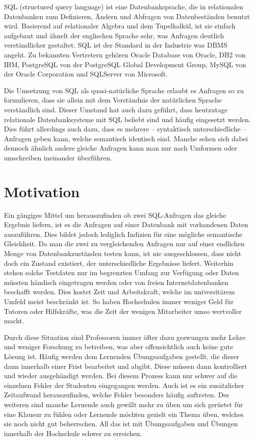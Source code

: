 
SQL (structured query language) ist eine Datenbanksprache, die in relationalen Datenbanken zum Definieren, Ändern und Abfragen von Datenbeständen benutzt wird. Basierend auf relationaler Algebra und dem Tupelkalkül, ist sie einfach aufgebaut und ähnelt der englischen Sprache sehr, was Anfragen deutlich verständlicher gestaltet. SQL ist der Standard in der Industrie was DBMS angeht. Zu bekannten Vertretern gehören Oracle Database von Oracle, DB2 von IBM, PostgreSQL von der PostgreSQL Global Development Group, MySQL von der Oracle Corporation und SQLServer von Microsoft.

Die Umsetzung von SQL als quasi-natürliche Sprache erlaubt es Anfragen so zu formulieren, dass sie allein mit dem Verständnis der natürlichen Sprache verständlich sind. Dieser Umstand hat auch dazu geführt, dass heutzutage relationale Datenbanksysteme mit SQL beliebt sind und häufig eingesetzt werden. 
Dies führt allerdings auch dazu, dass es mehrere -- syntaktisch unterschiedliche -- Anfragen geben kann, welche semantisch identisch sind. Manche sehen sich dabei dennoch ähnlich andere gleiche Anfragen kann man nur nach Umformen oder umschreiben ineinander überführen. 

\section{Motivation}

Ein gängiges Mittel um herauszufinden ob zwei SQL-Anfragen das gleiche Ergebnis liefern, ist es die Anfragen auf einer Datenbank mit vorhandenen Daten auszuführen. Dies bildet jedoch lediglich Indizien für eine mögliche semantische Gleichheit. Da man die zwei zu vergleichenden Anfragen nur auf einer endlichen Menge von Datenbankzuständen testen kann, ist nie ausgeschlossen, dass nicht doch ein Zustand existiert, der unterschiedliche Ergebnisse liefert. Weiterhin stehen solche Testdaten nur im begrenzten Umfang zur Verfügung oder Daten müssten händisch eingetragen werden oder von freien Internetdatenbanken beschafft werden. Dies kostet Zeit und Arbeitskraft, welche im universitärem Umfeld meist beschränkt ist. So haben Hochschulen immer weniger Geld für Tutoren oder Hilfskräfte, was die Zeit der wenigen Mitarbeiter umso wertvoller macht.

Durch diese Situation sind Professoren immer öfter dazu gezwungen mehr Lehre und weniger Forschung zu betreiben, was aber offensichtlich auch keine gute Lösung ist. Häufig werden dem Lernenden Übungsaufgaben gestellt, die dieser dann innerhalb einer Frist bearbeitet und abgibt. Diese müssen dann kontrolliert und wieder ausgehändigt werden. Bei diesem Prozess kann nur schwer auf die einzelnen Fehler der Studenten eingegangen werden. Auch ist es ein zusätzlicher Zeitaufwand herauszufinden, welche Fehler besonders häufig auftreten. Des weiteren sind manche Lernende auch gewillt mehr zu üben um sich gerüstet für eine Klausur zu fühlen oder Lernende möchten gezielt ein Thema üben, welches sie noch nicht gut beherrschen. All das ist mit Übungsaufgaben und Übungen innerhalb der Hochschule schwer zu erreichen. 

